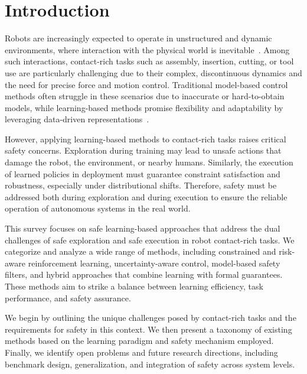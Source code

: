 \documentclass[Afour,sageh,times]{template/sagej}
\newcommand{\suggest}[1]{{\color{olive} (#1)}}
\begin{document}
\section{Introduction} \label{sec:intro}
Robots are increasingly expected to operate in unstructured and dynamic environments, where interaction with the physical world is inevitable~\citep{billard2019trends,ajoudani2018progress}. Among such interactions, contact-rich tasks such as assembly, insertion, cutting, or tool use are particularly challenging due to their complex, discontinuous dynamics and the need for precise force and motion control. Traditional model-based control methods often struggle in these scenarios due to inaccurate or hard-to-obtain models, while learning-based methods promise flexibility and adaptability by leveraging data-driven representations~\citep{elguea2023review}.

However, applying learning-based methods to contact-rich tasks raises critical safety concerns. Exploration during training may lead to unsafe actions that damage the robot, the environment, or nearby humans. Similarly, the execution of learned policies in deployment must guarantee constraint satisfaction and robustness, especially under distributional shifts. Therefore, safety must be addressed both during exploration and during execution to ensure the reliable operation of autonomous systems in the real world.

This survey focuses on safe learning-based approaches that address the dual challenges of safe exploration and safe execution in robot contact-rich tasks. We categorize and analyze a wide range of methods, including constrained and risk-aware reinforcement learning, uncertainty-aware control, model-based safety filters, and hybrid approaches that combine learning with formal guarantees. These methods aim to strike a balance between learning efficiency, task performance, and safety assurance.

We begin by outlining the unique challenges posed by contact-rich tasks and the requirements for safety in this context. We then present a taxonomy of existing methods based on the learning paradigm and safety mechanism employed. Finally, we identify open problems and future research directions, including benchmark design, generalization, and integration of safety across system levels.
\end{document}
